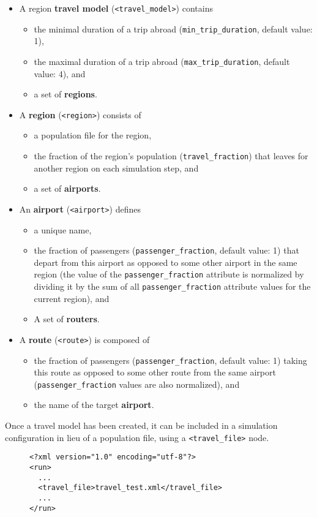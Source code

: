\begin{itemize}
	\item A region \textbf{travel model} (\texttt{<travel\_model>}) contains
	\begin{itemize}
		\item the minimal duration of a trip abroad (\texttt{min\_trip\_duration}, default value: 1),
		\item the maximal duration of a trip abroad (\texttt{max\_trip\_duration}, default value: 4), and
		\item a set of \textbf{regions}.
	\end{itemize}

	\item A \textbf{region} (\texttt{<region>}) consists of
	\begin{itemize}
		\item a population file for the region,
		\item the fraction of the region's population (\texttt{travel\_fraction}) that leaves for another region on each simulation step, and
		\item a set of \textbf{airports}.
	\end{itemize}

	\item An \textbf{airport} (\texttt{<airport>}) defines
	\begin{itemize}
		\item a unique name,
		\item the fraction of passengers (\texttt{passenger\_fraction}, default value: 1) that depart from this airport as opposed to some other airport in the same region (the value of the \texttt{passenger\_fraction} attribute is normalized by dividing it by the sum of all \texttt{passenger\_fraction} attribute values for the current region), and
		\item A set of \textbf{routers}.
	\end{itemize}

	\item A \textbf{route} (\texttt{<route>}) is composed of
	\begin{itemize}
		\item the fraction of passengers (\texttt{passenger\_fraction}, default value: 1) taking this route as opposed to some other route from the same airport (\texttt{passenger\_fraction} values are also normalized), and
		\item the name of the target \textbf{airport}.
	\end{itemize}
\end{itemize}

Once a travel model has been created, it can be included in a simulation configuration in lieu of a population file, using a \texttt{<travel\_file>} node.

\begin{figure}[h]
	\begin{lstlisting}
<?xml version="1.0" encoding="utf-8"?>
<run>
  ...
  <travel_file>travel_test.xml</travel_file>
  ...
</run>
	\end{lstlisting}
\end{figure}
